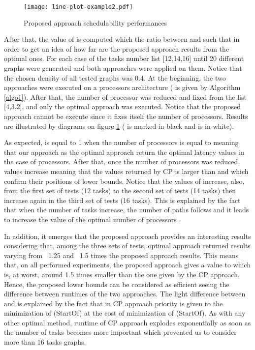 \documentclass{ijcaArticle}
\begin{document}
\begin{figure}[h!] 
\begin{center} 
\texttt{[image: line-plot-example2.pdf]} 
\caption{Proposed approach schedulability performances} 
\label{plot} 
\end{center} 
\end{figure}
After that, the value of  is computed which the ratio between  and  such that   
 in order to get an  idea of how far are the proposed approach results from the optimal ones. For each case of the tasks number list [12,14,16] until 20 different graphs were generated and both approaches were applied on them. Notice that the chosen density of all tested graphs was 0.4. At the beginning, the two approaches were executed on a  processors architecture ( is given by Algorithm \ref{algo1}). After that, the number of processor was reduced and fixed from the list [4,3,2], and only the optimal approach was executed. Notice that the proposed approach cannot be execute since it fixes itself  the number of processors. Results are illustrated by diagrams on figure \ref{plot} ( is marked in black and  is in white). 
 
As expected,  is equal to 1 when the number of processors is equal to  meaning that our approach as the optimal approach return the optimal latency values in the case of  processors. After that, once the number of processors was reduced,  values increase meaning that the values returned by CP is larger than  and   which confirm their positions of lower bounds. Notice that the values of  increase, also, from the first set of tests (12 tasks) to the second set of tests (14 tasks) then increase again in the third set of tests (16 tasks). This is explained by the fact that when the number of tasks increase, the number of paths follows and it leads to increase the value of the optimal number of processors . 
 
In addition, it emerges that the proposed approach provides an interesting results considering that, among the three sets of tests,  optimal approach returned results varying from ~1.25 and ~1.5 times the proposed approach results. This means that, on all performed experiments, the proposed approach gives a value to  which is, at worst, around 1.5 times smaller than the one given by the CP approach. Hence, the proposed lower bounds can be considered as efficient seeing the difference between runtimes of the two approaches.  The light difference between  and  is explained by the fact that in CP approach priority is given to the minimization of (StartOf) at the cost of minimization of  (StartOf). As with any other optimal method,  runtime of CP approach explodes exponentially  as soon as the number of tasks becomes more important which prevented us to consider more than 16 tasks graphs. 
\end{document}
